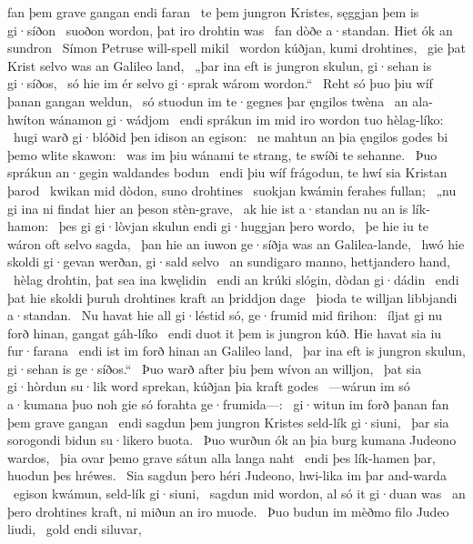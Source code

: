 fan þem grave gangan endi faran \hld\ te þem jungron Kristes,
sęggjan þem is gi·síðon \hld\ suoðon wordon,
þat iro drohtin was \hld\ fan dòðe a·standan.
Hiet ók an sundron \hld\ Símon Petruse
will-spell mikil \hld\ wordon kúðjan,
kumi drohtines, \hld\ gie þat Krist selvo
was an Galileo land, \hld\ „þar ina eft is jungron skulun,
gi·sehan is gi·síðos, \hld\ só hie im ér selvo gi·sprak
wárom wordon.“ \hld\ Reht só þuo þiu wíf þanan
gangan weldun, \hld\ só stuodun im te·gegnes þar
ęngilos twèna \hld\ an ala-hwíton
wánamon gi·wádjom \hld\ endi sprákun im mid iro wordon tuo
hèlag-líko: \hld\ hugi warð gi·blóðid
þen idison an egison: \hld\ ne mahtun an þia ęngilos godes
bi þemo wlite skawon: \hld\ was im þiu wánami te strang, %
te swíði te sehanne. \hld\ Þuo sprákun  an·gegin
waldandes bodun \hld\ endi þiu wíf frágodun,
te hwí sia Kristan þarod \hld\ kwikan mid dòdon,
suno drohtines \hld\ suokjan kwámin
ferahes fullan; \hld\ „nu gi ina ni findat hier
an þeson stèn-grave, \hld\ ak hie ist a·standan nu
an is lík-hamon: \hld\ þes gi gi·lòvjan skulun
endi gi·huggjan þero wordo, \hld\ þe hie iu te wáron oft
selvo sagda, \hld\ þan hie an iuwon ge·síðja was
an Galilea-lande, \hld\ hwó hie skoldi gi·gevan werðan,
gi·sald selvo \hld\ an sundigaro manno,
hettjandero hand, \hld\ hèlag drohtin,
þat sea ina kwęlidin \hld\ endi an krúki slógin,
dòdan gi·dádin \hld\ endi þat hie skoldi þuruh drohtines kraft
an þriddjon dage \hld\ þioda te willjan
libbjandi a·standan. \hld\ Nu havat hie all gi·léstid só,
ge·frumid mid firihon: \hld\ íljat gi nu forð hinan,
gangat gáh-líko \hld\ endi duot it þem is jungron kúð.
Hie havat sia iu fur·farana \hld\ endi ist im forð hinan
an Galileo land, \hld\ þar ina eft is jungron skulun,
gi·sehan is ge·síðos.“ \hld\ Þuo warð  after þiu
þem wívon an willjon, \hld\ þat sia gi·hòrdun su·lik word sprekan,
kúðjan þia kraft godes \hld\ —wárun im só a·kumana þuo noh
gie só forahta ge·frumida—: \hld\ gi·witun im forð þanan %
fan þem grave gangan \hld\ endi sagdun þem jungron Kristes
seld-lík gi·siuni, \hld\ þar sia sorogondi
bidun su·likero buota. \hld\ Þuo wurðun ók an þia burg kumana
Judeono wardos, \hld\ þia ovar þemo grave sátun
alla langa naht \hld\ endi þes lík-hamen þar,
huodun þes hréwes. \hld\ Sia sagdun þero héri Judeono,
hwi-lika im þar and-warda \hld\ egison kwámun,
seld-lík gi·siuni, \hld\ sagdun mid wordon,
al só it gi·duan was \hld\ an þero drohtines kraft,
ni miðun an iro muode. \hld\ Þuo budun im mèðmo filo
Judeo liudi, \hld\ gold endi siluvar,
